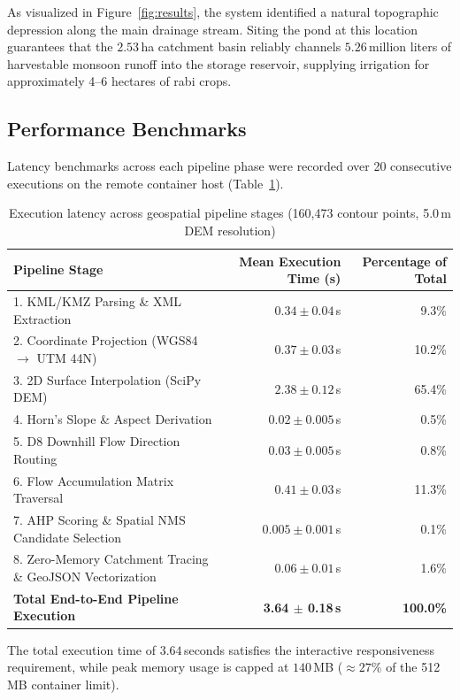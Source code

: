 \documentclass[manuscript,screen,review]{acmart}
\begin{document}
As visualized in Figure~\ref{fig:results}, the system identified a natural topographic depression along the main drainage stream. Siting the pond at this location guarantees that the $2.53$\,ha catchment basin reliably channels $5.26$\,million liters of harvestable monsoon runoff into the storage reservoir, supplying irrigation for approximately 4--6 hectares of rabi crops.

\subsection{Performance Benchmarks}
Latency benchmarks across each pipeline phase were recorded over 20 consecutive executions on the remote container host (Table~\ref{tab:perf}).

\begin{table}[h]
  \caption{Execution latency across geospatial pipeline stages (160,473 contour points, 5.0\,m DEM resolution)}
  \label{tab:perf}
  \small
  \begin{tabular}{lrr}
    \toprule
    Pipeline Stage & Mean Execution Time (s) & Percentage of Total \\
    \midrule
    1. KML/KMZ Parsing \& XML Extraction & $0.34 \pm 0.04$\,s & 9.3\% \\
    2. Coordinate Projection (WGS84 $\rightarrow$ UTM 44N) & $0.37 \pm 0.03$\,s & 10.2\% \\
    3. 2D Surface Interpolation (SciPy DEM) & $2.38 \pm 0.12$\,s & 65.4\% \\
    4. Horn's Slope \& Aspect Derivation & $0.02 \pm 0.005$\,s & 0.5\% \\
    5. D8 Downhill Flow Direction Routing & $0.03 \pm 0.005$\,s & 0.8\% \\
    6. Flow Accumulation Matrix Traversal & $0.41 \pm 0.03$\,s & 11.3\% \\
    7. AHP Scoring \& Spatial NMS Candidate Selection & $0.005 \pm 0.001$\,s & 0.1\% \\
    8. Zero-Memory Catchment Tracing \& GeoJSON Vectorization & $0.06 \pm 0.01$\,s & 1.6\% \\
    \midrule
    \textbf{Total End-to-End Pipeline Execution} & \textbf{3.64 $\pm$ 0.18\,s} & \textbf{100.0\%} \\
    \bottomrule
  \end{tabular}
\end{table}

The total execution time of $3.64$\,seconds satisfies the interactive responsiveness requirement, while peak memory usage is capped at $140$\,MB ($\approx 27\%$ of the 512\,MB container limit).
\end{document}
